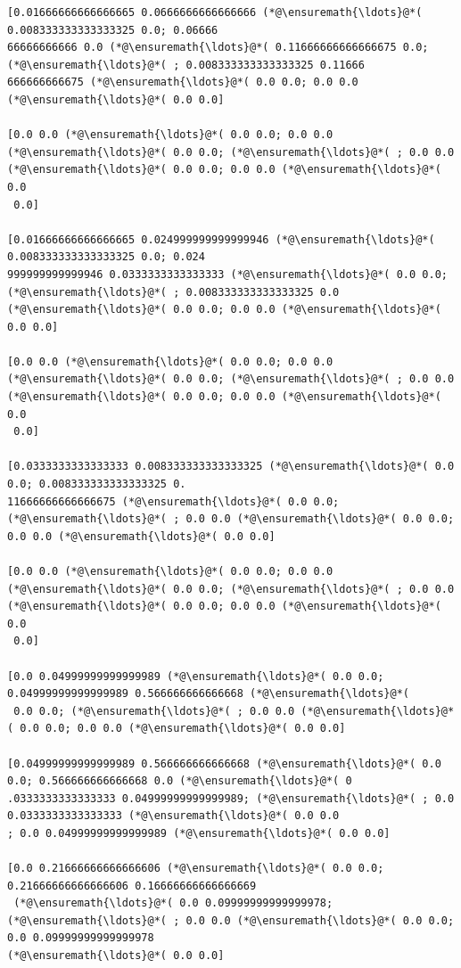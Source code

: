 \documentclass[12pt,a4paper]{article}
\begin{document}
\begin{lstlisting}
[0.01666666666666665 0.0666666666666666 (*@\ensuremath{\ldots}@*( 0.008333333333333325 0.0; 0.06666
66666666666 0.0 (*@\ensuremath{\ldots}@*( 0.11666666666666675 0.0; (*@\ensuremath{\ldots}@*( ; 0.008333333333333325 0.11666
666666666675 (*@\ensuremath{\ldots}@*( 0.0 0.0; 0.0 0.0 (*@\ensuremath{\ldots}@*( 0.0 0.0]

[0.0 0.0 (*@\ensuremath{\ldots}@*( 0.0 0.0; 0.0 0.0 (*@\ensuremath{\ldots}@*( 0.0 0.0; (*@\ensuremath{\ldots}@*( ; 0.0 0.0 (*@\ensuremath{\ldots}@*( 0.0 0.0; 0.0 0.0 (*@\ensuremath{\ldots}@*( 0.0
 0.0]

[0.01666666666666665 0.024999999999999946 (*@\ensuremath{\ldots}@*( 0.008333333333333325 0.0; 0.024
999999999999946 0.0333333333333333 (*@\ensuremath{\ldots}@*( 0.0 0.0; (*@\ensuremath{\ldots}@*( ; 0.008333333333333325 0.0 
(*@\ensuremath{\ldots}@*( 0.0 0.0; 0.0 0.0 (*@\ensuremath{\ldots}@*( 0.0 0.0]

[0.0 0.0 (*@\ensuremath{\ldots}@*( 0.0 0.0; 0.0 0.0 (*@\ensuremath{\ldots}@*( 0.0 0.0; (*@\ensuremath{\ldots}@*( ; 0.0 0.0 (*@\ensuremath{\ldots}@*( 0.0 0.0; 0.0 0.0 (*@\ensuremath{\ldots}@*( 0.0
 0.0]

[0.0333333333333333 0.008333333333333325 (*@\ensuremath{\ldots}@*( 0.0 0.0; 0.008333333333333325 0.
11666666666666675 (*@\ensuremath{\ldots}@*( 0.0 0.0; (*@\ensuremath{\ldots}@*( ; 0.0 0.0 (*@\ensuremath{\ldots}@*( 0.0 0.0; 0.0 0.0 (*@\ensuremath{\ldots}@*( 0.0 0.0]

[0.0 0.0 (*@\ensuremath{\ldots}@*( 0.0 0.0; 0.0 0.0 (*@\ensuremath{\ldots}@*( 0.0 0.0; (*@\ensuremath{\ldots}@*( ; 0.0 0.0 (*@\ensuremath{\ldots}@*( 0.0 0.0; 0.0 0.0 (*@\ensuremath{\ldots}@*( 0.0
 0.0]

[0.0 0.04999999999999989 (*@\ensuremath{\ldots}@*( 0.0 0.0; 0.04999999999999989 0.566666666666668 (*@\ensuremath{\ldots}@*(
 0.0 0.0; (*@\ensuremath{\ldots}@*( ; 0.0 0.0 (*@\ensuremath{\ldots}@*( 0.0 0.0; 0.0 0.0 (*@\ensuremath{\ldots}@*( 0.0 0.0]

[0.04999999999999989 0.566666666666668 (*@\ensuremath{\ldots}@*( 0.0 0.0; 0.566666666666668 0.0 (*@\ensuremath{\ldots}@*( 0
.0333333333333333 0.04999999999999989; (*@\ensuremath{\ldots}@*( ; 0.0 0.0333333333333333 (*@\ensuremath{\ldots}@*( 0.0 0.0
; 0.0 0.04999999999999989 (*@\ensuremath{\ldots}@*( 0.0 0.0]

[0.0 0.21666666666666606 (*@\ensuremath{\ldots}@*( 0.0 0.0; 0.21666666666666606 0.16666666666666669
 (*@\ensuremath{\ldots}@*( 0.0 0.09999999999999978; (*@\ensuremath{\ldots}@*( ; 0.0 0.0 (*@\ensuremath{\ldots}@*( 0.0 0.0; 0.0 0.09999999999999978 
(*@\ensuremath{\ldots}@*( 0.0 0.0]


\end{lstlisting}
\end{document}
